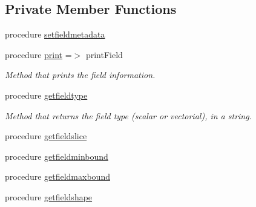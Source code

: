 \subsection*{Private Member Functions}
\begin{DoxyCompactItemize}
\item 
procedure \mbox{\hyperlink{structfieldtypes__mod_1_1field__class_a3dd056d55794122c3358d103e2c56f18}{setfieldmetadata}}
\item 
procedure \mbox{\hyperlink{structfieldtypes__mod_1_1field__class_afaab58efcda61608934254b6b4d85ed5}{print}} =$>$ print\+Field
\begin{DoxyCompactList}\small\item\em Method that prints the field information. \end{DoxyCompactList}\item 
procedure \mbox{\hyperlink{structfieldtypes__mod_1_1field__class_a8474f700cf545721b177e1fc91020fd7}{getfieldtype}}
\begin{DoxyCompactList}\small\item\em Method that returns the field type (scalar or vectorial), in a string. \end{DoxyCompactList}\item 
procedure \mbox{\hyperlink{structfieldtypes__mod_1_1field__class_aea2e4a6d0c0670f91af911f398b92c7a}{getfieldslice}}
\item 
procedure \mbox{\hyperlink{structfieldtypes__mod_1_1field__class_ac649c9d1381497b945ccdb67b84ddd1a}{getfieldminbound}}
\item 
procedure \mbox{\hyperlink{structfieldtypes__mod_1_1field__class_a8275318f997672a2933ff6bbdcffa521}{getfieldmaxbound}}
\item 
procedure \mbox{\hyperlink{structfieldtypes__mod_1_1field__class_a744774bc9ac7ce6b8e2c9e35b8c19a7b}{getfieldshape}}
\end{DoxyCompactItemize}

